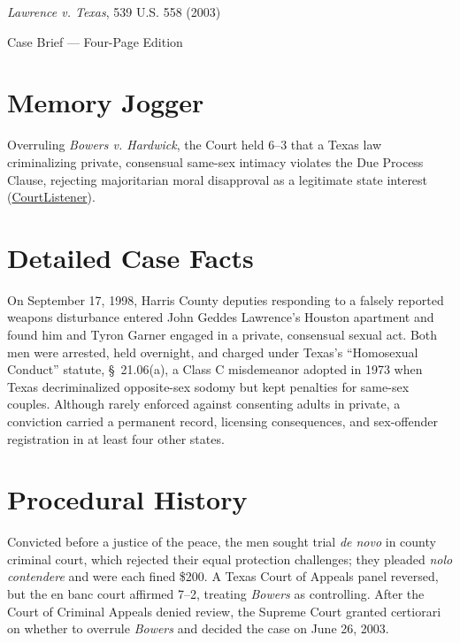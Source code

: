 \documentclass[12pt]{article}
\begin{document}
\begin{center}
{\LARGE \textit{Lawrence v. Texas}, 539 U.S. 558 (2003)\par}
\vspace{0.8em}
{\large Case Brief --- Four-Page Edition\par}
\end{center}
\vspace{1em}

\section{Memory Jogger}

Overruling \textit{Bowers v. Hardwick}, the Court held 6--3 that a Texas law criminalizing private, consensual same-sex intimacy violates the Due Process Clause, rejecting majoritarian moral disapproval as a legitimate state interest (\href{https://www.courtlistener.com/opinion/130160/lawrence-v-texas/}{CourtListener}).

\section{Detailed Case Facts}

On September 17, 1998, Harris County deputies responding to a falsely reported weapons disturbance entered John Geddes Lawrence's Houston apartment and found him and Tyron Garner engaged in a private, consensual sexual act. Both men were arrested, held overnight, and charged under Texas's ``Homosexual Conduct'' statute, \S~21.06(a), a Class C misdemeanor adopted in 1973 when Texas decriminalized opposite-sex sodomy but kept penalties for same-sex couples. Although rarely enforced against consenting adults in private, a conviction carried a permanent record, licensing consequences, and sex-offender registration in at least four other states.

\section{Procedural History}

Convicted before a justice of the peace, the men sought trial \textit{de novo} in county criminal court, which rejected their equal protection challenges; they pleaded \textit{nolo contendere} and were each fined \$200. A Texas Court of Appeals panel reversed, but the en banc court affirmed 7--2, treating \textit{Bowers} as controlling. After the Court of Criminal Appeals denied review, the Supreme Court granted certiorari on whether to overrule \textit{Bowers} and decided the case on June 26, 2003.
\end{document}
